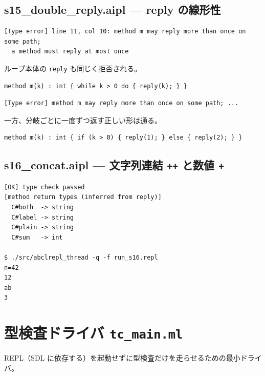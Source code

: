 \documentclass[11pt,a4paper]{ltjsarticle}
\theoremstyle{definition}
\theoremstyle{remark}
\begin{document}
\subsection{s15\_double\_reply.aipl --- reply の線形性}



\begin{lstlisting}[language={}]
[Type error] line 11, col 10: method m may reply more than once on some path;
  a method must reply at most once
\end{lstlisting}

ループ本体の \texttt{reply} も同じく拒否される。

\begin{lstlisting}[language=AIPL]
method m(k) : int { while k > 0 do { reply(k); } }
\end{lstlisting}

\begin{lstlisting}[language={}]
[Type error] method m may reply more than once on some path; ...
\end{lstlisting}

一方、分岐ごとに一度ずつ返す正しい形は通る。

\begin{lstlisting}[language=AIPL]
method m(k) : int { if (k > 0) { reply(1); } else { reply(2); } }
\end{lstlisting}

\subsection{s16\_concat.aipl --- 文字列連結 \texttt{++} と数値 \texttt{+}}



\begin{lstlisting}[language={}]
[OK] type check passed
[method return types (inferred from reply)]
  C#both  -> string
  C#label -> string
  C#plain -> string
  C#sum   -> int

$ ./src/abclrepl_thread -q -f run_s16.repl
n=42
12
ab
3
\end{lstlisting}

\section{型検査ドライバ \texttt{tc\_main.ml}}
\label{sec:driver}

REPL（SDL に依存する）を起動せずに型検査だけを走らせるための最小ドライバ。
\end{document}
